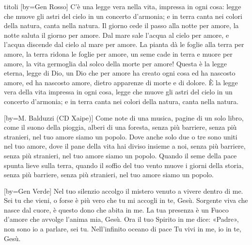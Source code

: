 \begin{songs}{titoli}
[by={Gen Rosso}]
\beginverse*
C'è una legge vera nella vita, impressa in ogni cosa:
legge che muove gli astri del cielo in un concerto d'armonia;
e in terra canta nei colori della natura, canta nella natura.
\endverse
\beginverse*
Il giorno cede il passo alla notte per amore,
la notte saluta il giorno per amore.
Dal mare sale l'acqua al cielo per amore,
e l'acqua discende dal cielo al mare per amore.
La pianta dà le foglie alla terra per amore,
la terra ridona le foglie per amore,
un seme cade in terra e muore per amore,
la vita germoglia dal solco della morte per amore!
\endverse
\beginchorus
Questa è la legge eterna, legge di Dio,
un Dio che per amore ha creato ogni cosa
ed ha nascosto amore, ed ha nascosto amore,
dietro apparenze di morte e di dolore.
\endchorus
\beginverse*
È la legge vera della vita impressa in ogni cosa,
legge che muove gli astri del cielo in un concerto d'armonia;
e in terra canta nei colori della natura, canta nella natura. 
\endverse
\endsong

[by={M. Balduzzi (CD Xaipe)}]
\beginverse
Come note di una musica, pagine di un solo libro,
come il suono della pioggia, alberi di una foresta,
senza più barriere, senza più stranieri,
nel tuo amore siamo un popolo.
\endverse
\beginverse
Dove anche solo due o tre sono uniti nel tuo amore,
dove il pane della vita hai diviso insieme a noi,
senza più barriere, senza più stranieri,
nel tuo amore siamo un popolo.
\endverse
\beginverse
Quando il seme della pace spunta lieve sulla terra,
quando il soffio del tuo vento muove i giorni della storia,
senza più barriere, senza più stranieri,
nel tuo amore siamo un popolo. 
\endverse
\endsong

[by={Gen Verde}]
\beginverse
Nel tuo silenzio accolgo il mistero venuto a vivere dentro di me.
Sei tu che vieni, o forse è più vero che tu mi accogli in te, Gesù.
\endverse
\beginverse
Sorgente viva che nasce dal cuore, è questo dono che abita in me.
La tua presenza è un Fuoco d'amore che avvolge l'anima mia, Gesù.
\endverse
\beginverse
Ora il tuo Spirito in me dice: «Padre», non sono io a parlare, sei tu.
Nell'infinito oceano di pace Tu vivi in me, io in te, Gesù.
\endverse
\endsong


\end{songs}
